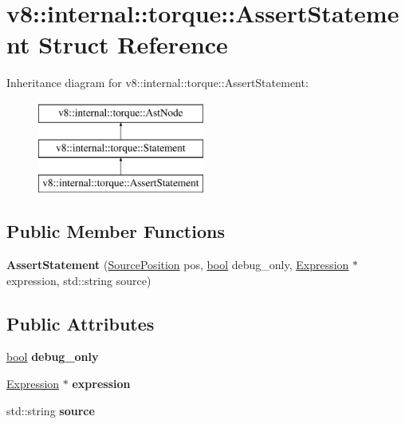 \hypertarget{structv8_1_1internal_1_1torque_1_1AssertStatement}{}\section{v8\+:\+:internal\+:\+:torque\+:\+:Assert\+Statement Struct Reference}
\label{structv8_1_1internal_1_1torque_1_1AssertStatement}
Inheritance diagram for v8\+:\+:internal\+:\+:torque\+:\+:Assert\+Statement\+:\begin{figure}[H]
\begin{center}
\leavevmode
\includegraphics[height=3.000000cm]{structv8_1_1internal_1_1torque_1_1AssertStatement}
\end{center}
\end{figure}
\subsection*{Public Member Functions}
\begin{DoxyCompactItemize}
\item 
\mbox{\label{structv8_1_1internal_1_1torque_1_1AssertStatement_a8c3c6a6dbb4ca642fa376c0a0e7cc9c8}} 
{\bfseries Assert\+Statement} (\mbox{\hyperlink{structv8_1_1internal_1_1torque_1_1SourcePosition}{Source\+Position}} pos, \mbox{\hyperlink{classbool}{bool}} debug\+\_\+only, \mbox{\hyperlink{structv8_1_1internal_1_1torque_1_1Expression}{Expression}} $\ast$expression, std\+::string source)
\end{DoxyCompactItemize}
\subsection*{Public Attributes}
\begin{DoxyCompactItemize}
\item 
\mbox{\label{structv8_1_1internal_1_1torque_1_1AssertStatement_ae57d4d9c116d819c6e18041aacaa4f46}} 
\mbox{\hyperlink{classbool}{bool}} {\bfseries debug\+\_\+only}
\item 
\mbox{\label{structv8_1_1internal_1_1torque_1_1AssertStatement_ae5dd939513bc87a848efb94e3d411c60}} 
\mbox{\hyperlink{structv8_1_1internal_1_1torque_1_1Expression}{Expression}} $\ast$ {\bfseries expression}
\item 
\mbox{\label{structv8_1_1internal_1_1torque_1_1AssertStatement_ae1becbb624864245aded5c95bed09948}} 
std\+::string {\bfseries source}
\end{DoxyCompactItemize}
